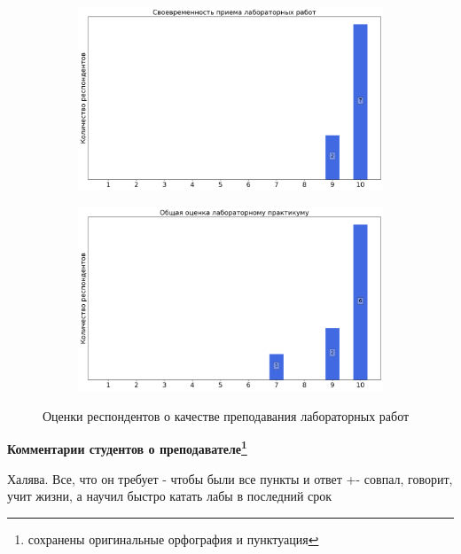 \begin{figure}[H]
\begin{subfigure}[b]{0.45\textwidth}
                \includegraphics[width=\textwidth]{images/1 course/Общая физика - механика/labniks-marks-Ципенюк Д.Ю.-2.png}
            \end{subfigure}
            \begin{subfigure}[b]{0.45\textwidth}
                \centering
                \includegraphics[width=\textwidth]{images/1 course/Общая физика - механика/labniks-marks-Ципенюк Д.Ю.-3.png}
            \end{subfigure}	
            \caption{Оценки респондентов о качестве преподавания лабораторных работ}
        \end{figure}

        \textbf{Комментарии студентов о преподавателе\protect\footnote{сохранены оригинальные орфография и пунктуация}}
            \begin{commentbox} 
                Халява. Все, что он требует - чтобы были все пункты и ответ +- совпал, говорит, учит жизни, а научил быстро катать лабы в последний срок 
            \end{commentbox} 
        
